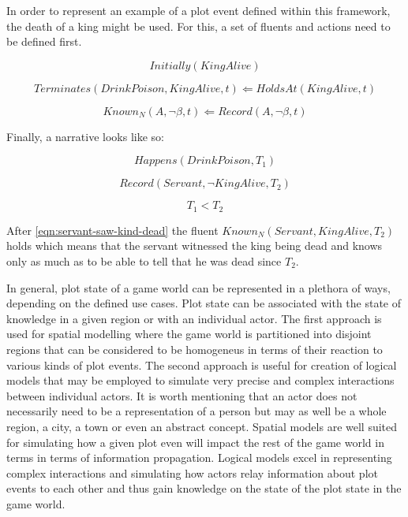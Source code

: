 In order to represent an example of a plot event defined within this framework, the death of a king might be used.
For this, a set of fluents and actions need to be defined first.

\begin{equation}
    Initially \left( KingAlive \right)
\end{equation}

\begin{equation}
    Terminates \left( DrinkPoison, KingAlive, t \right) \Leftarrow HoldsAt \left( KingAlive, t \right)
\end{equation}

\begin{equation}
    Known_N \left( A, \lnot \beta, t \right) \Leftarrow Record \left( A, \lnot \beta, t \right)
\end{equation}

Finally, a narrative looks like so:

\begin{equation}
    Happens \left( DrinkPoison, T_1 \right)
\end{equation}

\begin{equation}
    \label{eqn:servant-saw-kind-dead}
    Record \left( Servant, \lnot KingAlive, T_2 \right)
\end{equation}

\begin{equation}
    T_1 < T_2
\end{equation}

After \ref{eqn:servant-saw-kind-dead} the fluent $Known_N \left( Servant, KingAlive, T_2 \right)$ holds which means that the servant witnessed the king being dead and knows only as much as to be able to tell that he was dead since $T_2$.

In general, plot state of a game world can be represented in a plethora of ways, depending on the defined use cases.
Plot state can be associated with the state of knowledge in a given region or with an individual actor.
The first approach is used for spatial modelling where the game world is partitioned into disjoint regions that can be considered to be homogeneus in terms of their reaction to various kinds of plot events.
The second approach is useful for creation of logical models that may be employed to simulate very precise and complex interactions between individual actors.
It is worth mentioning that an actor does not necessarily need to be a representation of a person but may as well be a whole region, a city, a town or even an abstract concept.
Spatial models are well suited for simulating how a given plot even will impact the rest of the game world in terms in terms of information propagation.
Logical models excel in representing complex interactions and simulating how actors relay information about plot events to each other and thus gain knowledge on the state of the plot state in the game world.

